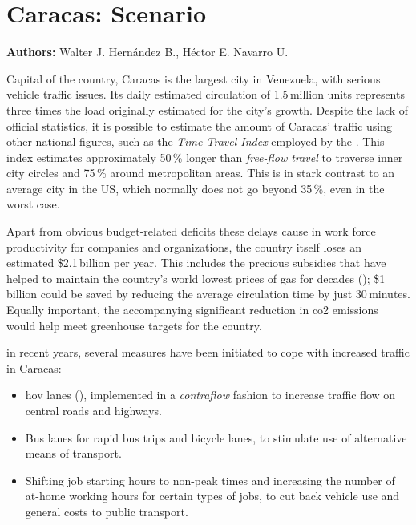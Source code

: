 \chapter{Caracas: Scenario}
\label{ch:caracas}
\hfill \textbf{Authors:} Walter J. Hernández B., Héctor E. Navarro U.


Capital of the country, Caracas is the largest city in Venezuela, with serious vehicle traffic issues. Its daily estimated circulation of 1.5\,million units represents three times the load originally estimated for the city's growth. %
Despite the lack of official statistics, it is possible to estimate the amount of Caracas' traffic using other national figures, such as the \emph{Time Travel Index} employed by the \citet{fhwa2013}. This index estimates approximately 50\,\% longer than \textit{free-flow travel} to traverse inner city circles and 75\,\% around  metropolitan areas. This is in stark contrast to an average city in the US, which normally does not go beyond 35\,\%, even in the worst case.

Apart from obvious budget-related deficits these delays cause in work force productivity for companies and organizations, the country itself loses an estimated \$2.1\,billion per year. This includes the precious subsidies that have helped to maintain the country's world lowest prices of gas for decades (\citet{wilson2008});  \$1\,billion could be saved by reducing the average circulation time by just 30\,minutes. Equally important, the accompanying significant reduction in \gls{co2} emissions would help meet greenhouse targets for the country.

in recent years, several measures have been initiated to cope with increased traffic in Caracas:

\begin{itemize}\styleItemize
\item \gls{hov} lanes (\citet{turnbull1990}), implemented in a \textit{contraflow} fashion to increase traffic flow on central roads and highways.

\item Bus lanes for rapid bus trips and bicycle lanes, to stimulate use of alternative means of transport.

\item Shifting job starting hours to non-peak times and increasing the number of at-home working hours for certain types of jobs, to cut back vehicle use and general costs to public transport.
\end{itemize}

